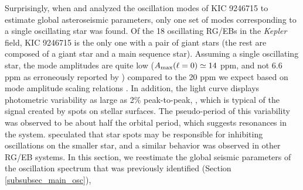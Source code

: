 Surprisingly, when \citet{gau13} and \citet{gau14} analyzed the oscillation modes of KIC 9246715 to estimate global asteroseismic parameters, only one set of modes corresponding to a single oscillating star was found. Of the 18 oscillating RG/EBs in the \emph{Kepler} field, KIC 9246715 is the only one with a pair of giant stars (the rest are composed of a giant star and a main sequence star).
Assuming a single oscillating star, the mode amplitudes are quite low ($A_{\rm{max}}(\ell=0) \simeq 14$ ppm, and not 6.6 ppm as erroneously reported by \citealt{gau14}) compared to the 20 ppm we expect based on mode amplitude scaling relations \citep{cor13}. In addition, the light curve displays photometric variability as large as 2\% peak-to-peak, , which is typical of the signal created by spots on stellar surfaces. The pseudo-period of this variability was observed to be about half the orbital period, which suggests resonances in the system. \citet{gau14} speculated that star spots may be responsible for inhibiting oscillations on the smaller star, and a similar behavior was observed in other RG/EB systems. In this section, we reestimate the global seismic parameters of the oscillation spectrum that was previously identified (Section \ref{subsubsec_main_osc}), 

